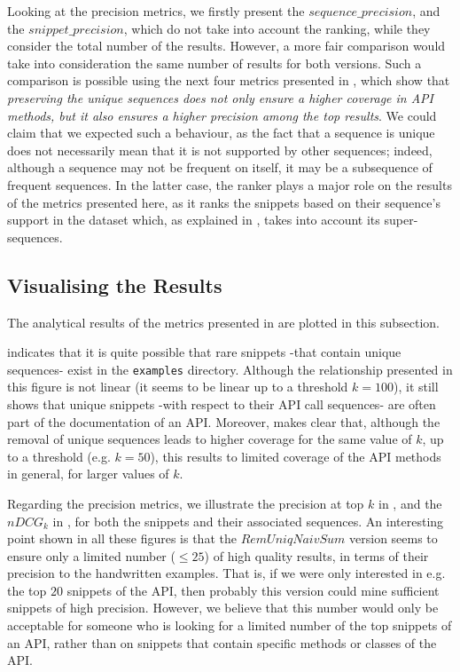 Looking at the precision metrics, we firstly present the $sequence\_precision$, and the $snippet\_precision$, which do not take into account the ranking, while they consider the total number of the results. However, a more fair comparison would take into consideration the same number of results for both versions. Such a comparison is possible using the next four metrics presented in , which show that \textit{preserving the unique sequences does not only ensure a higher coverage in API methods, but it also ensures a higher precision among the top results}. We could claim that we expected such a behaviour, as the fact that a sequence is unique does not necessarily mean that it is not supported by other sequences; indeed, although a sequence may not be frequent on itself, it may be a subsequence of frequent sequences. In the latter case, the ranker plays a major role on the results of the metrics presented here, as it ranks the snippets based on their sequence's support in the dataset which, as explained in , takes into account its super-sequences.


\subsection{Visualising the Results}
\label{subsec:evaluation-exp2-plots}

The analytical results of the metrics presented in  are plotted in this subsection.

 indicates that it is quite possible that rare snippets -that contain unique sequences- exist in the \texttt{examples} directory. Although the relationship presented in this figure is not linear (it seems to be linear up to a threshold $k=100$), it still shows that unique snippets -with respect to their API call sequences- are often part of the documentation of an API. Moreover,  makes clear that, although the removal of unique sequences leads to higher coverage for the same value of $k$, up to a threshold (e.g. $k=50$), this results to limited coverage of the API methods in general, for larger values of $k$.

Regarding the precision metrics, we illustrate the precision at top $k$ in , and the $nDCG_k$ in , for both the snippets and their associated sequences. An interesting point shown in all these figures is that the $RemUniqNaivSum$ version seems to ensure only a limited number ($\leq 25$) of high quality results, in terms of their precision to the handwritten examples. That is, if we were only interested in e.g. the top $20$ snippets of the API, then probably this version could mine sufficient snippets of high precision. However, we believe that this number would only be acceptable for someone who is looking for a limited number of the top snippets of an API, rather than on snippets that contain specific methods or classes of the API.

